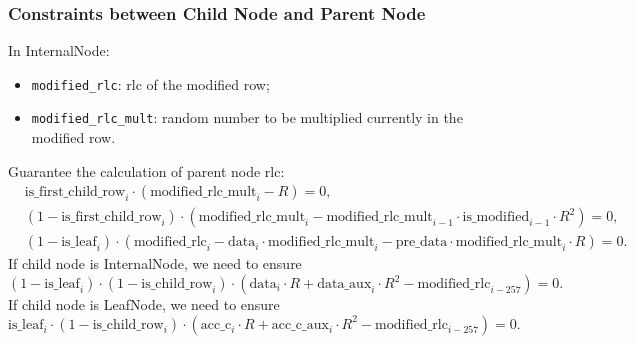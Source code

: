 \subsubsection{Constraints between Child Node and Parent Node}

In InternalNode:
\begin{itemize}
    \item \verb|modified_rlc|: rlc of the modified row;
    \item \verb|modified_rlc_mult|: random number to be multiplied currently in the modified row.
\end{itemize}

Guarantee the calculation of parent node rlc:
\begin{align*}
    & \mathrm{is\_first\_child\_row}_i \cdot (\mathrm{modified\_rlc\_mult}_i - R) = 0, \\
    & (1-\mathrm{is\_first\_child\_row}_i) \cdot (\mathrm{modified\_rlc\_mult}_i-\mathrm{modified\_rlc\_mult}_{i-1} \cdot \mathrm{is\_modified}_{i-1} \cdot R^2 )= 0, \\
    & (1-\mathrm{is\_leaf}_i) \cdot (\mathrm{modified\_rlc}_i - \mathrm{data}_i \cdot \mathrm{modified\_rlc\_mult}_i-\mathrm{pre\_data} \cdot \mathrm{modified\_rlc\_mult}_i \cdot R)=0.
\end{align*}
If child node is InternalNode, we need to ensure
\[ (1-\mathrm{is\_leaf}_i) \cdot (1-\mathrm{is\_child\_row}_i) \cdot (\mathrm{data}_i \cdot R + \mathrm{data\_aux}_i \cdot R^2 - \mathrm{modified\_rlc}_{i-257})=0. \]
If child node is LeafNode, we need to ensure
\[ \mathrm{is\_leaf}_i \cdot (1-\mathrm{is\_child\_row}_i) \cdot (\mathrm{acc\_c}_i \cdot R + \mathrm{acc\_c\_aux}_i \cdot R^2 - \mathrm{modified\_rlc}_{i-257})=0. \]
